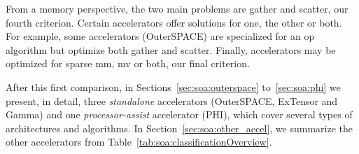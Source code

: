 From a memory perspective, the two main problems are \gls{gather} and \gls{scatter}, our fourth criterion.
Certain accelerators offer solutions for one, the other or both.
For example, some accelerators (\ex OuterSPACE) are specialized for an \acrshort{op} algorithm but optimize both \gls{gather} and \gls{scatter}.
Finally, accelerators may be optimized for sparse \acrshort{mm}, \acrshort{mv} or both, our final criterion.

After this first comparison, in Sections~\ref{sec:soa:outerspace} to~\ref{sec:soa:phi} we present, in detail, three \textit{standalone} accelerators (\eg OuterSPACE, ExTensor and Gamma) and one \textit{processor-assist} accelerator (\eg PHI), which cover several types of architectures and algorithms.
In Section~\ref{sec:soa:other_accel}, we summarize the other accelerators from Table~\ref{tab:soa:classificationOverview}.

